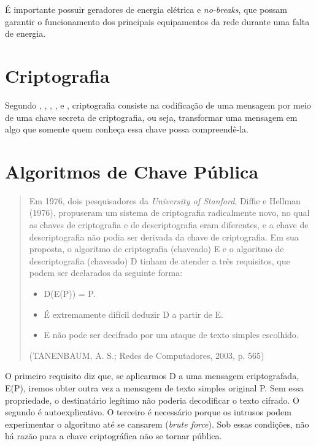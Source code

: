 \documentclass{abnt}
\begin{document}
É importante possuir geradores de energia elétrica e \textit{no-breaks}, que possam garantir o funcionamento dos principais equipamentos
da rede durante uma falta de energia.


\section{Criptografia}

Segundo , , , ,  e , criptografia consiste
na codificação de uma mensagem por meio de uma chave secreta de criptografia, ou seja, transformar uma mensagem em algo que somente quem
conheça essa chave possa compreendê-la.


\section{Algoritmos de Chave Pública}

\begin{quotation}

Em 1976, dois pesquisadores da \textit{University of Stanford}, Diffie e Hellman (1976), propuseram um
sistema de criptografia radicalmente novo, no qual as chaves de criptografia e de descriptografia
eram diferentes, e a chave de descriptografia não podia ser derivada da chave de criptografia. Em
sua proposta, o algoritmo de criptografia (chaveado) E e o algoritmo de descriptografia (chaveado)
D tinham de atender a três requisitos, que podem ser declarados da seguinte forma:

\begin{itemize}

	\item D(E(P)) = P.
    \item É extremamente difícil deduzir D a partir de E.
    \item E não pode ser decifrado por um ataque de texto simples escolhido.

\end{itemize}

(TANENBAUM, A. S.; Redes de Computadores, 2003, p. 565)

\end{quotation}

O primeiro requisito diz que, se aplicarmos D a uma mensagem criptografada, E(P), iremos obter outra vez a mensagem de texto simples original P.
Sem essa propriedade, o destinatário legítimo não poderia decodificar o texto cifrado. O segundo é autoexplicativo. O terceiro é necessário
porque os intrusos podem experimentar o algoritmo até se cansarem (\textit{brute force}). Sob essas condições, não há razão para a chave
criptográfica não se tornar pública.
\end{document}
